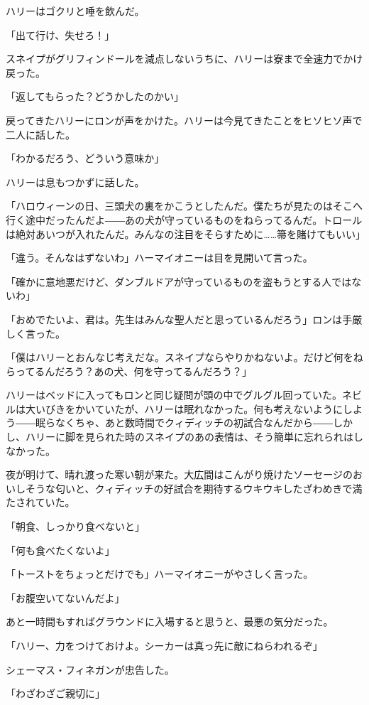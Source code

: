 \documentclass[10pt,a4paper]{article}
\begin{document}
\begin{CJK}{UTF8}{min}
ハリーはゴクリと唾を飲んだ。

「出て行け、失せろ！」

スネイプがグリフィンドールを減点しないうちに、ハリーは寮まで全速力でかけ戻った。

「返してもらった？どうかしたのかい」

戻ってきたハリーにロンが声をかけた。ハリーは今見てきたことをヒソヒソ声で二人に話した。

「わかるだろう、どういう意味か」

ハリーは息もつかずに話した。

「ハロウィーンの日、三頭犬の裏をかこうとしたんだ。僕たちが見たのはそこへ行く途中だったんだよ――あの犬が守っているものをねらってるんだ。トロールは絶対あいつが入れたんだ。みんなの注目をそらすために……箒を賭けてもいい」

「違う。そんなはずないわ」ハーマイオニーは目を見開いて言った。

「確かに意地悪だけど、ダンブルドアが守っているものを盗もうとする人ではないわ」

「おめでたいよ、君は。先生はみんな聖人だと思っているんだろう」ロンは手厳しく言った。

「僕はハリーとおんなじ考えだな。スネイプならやりかねないよ。だけど何をねらってるんだろう？あの犬、何を守ってるんだろう？」

ハリーはベッドに入ってもロンと同じ疑問が頭の中でグルグル回っていた。ネビルは大いびきをかいていたが、ハリーは眠れなかった。何も考えないようにしよう――眠らなくちゃ、あと数時間でクィディッチの初試合なんだから――しかし、ハリーに脚を見られた時のスネイプのあの表情は、そう簡単に忘れられはしなかった。



夜が明けて、晴れ渡った寒い朝が来た。大広間はこんがり焼けたソーセージのおいしそうな匂いと、クィディッチの好試合を期待するウキウキしたざわめきで満たされていた。

「朝食、しっかり食べないと」

「何も食べたくないよ」

「トーストをちょっとだけでも」ハーマイオニーがやさしく言った。

「お腹空いてないんだよ」

あと一時間もすればグラウンドに入場すると思うと、最悪の気分だった。

「ハリー、力をつけておけよ。シーカーは真っ先に敵にねらわれるぞ」

シェーマス・フィネガンが忠告した。

「わざわざご親切に」


\end{CJK}
\end{document}

